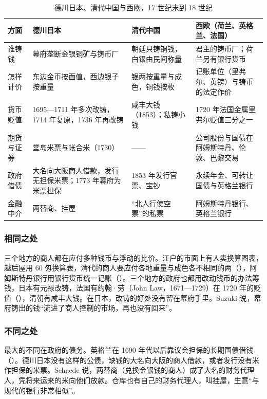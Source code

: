 \begin{table}[htbp]\centering\small
\caption{德川日本、清代中国与西欧，17 世纪末到 18 世纪}\label{tab:toku-europe}
\begin{tabularx}{\linewidth}{@{}l Y Y Y@{}}
\toprule
方面 & 德川日本 & 清代中国 & 西欧（荷兰、英格兰、法国） \\\midrule
谁铸钱 & 幕府垄断金银铜矿与铸币厂 & 朝廷只铸铜钱，白银由民间称量 & 君主的铸币厂；荷兰另有银行货币 \\
怎样计价 & 东边金币按面值，西边银子按重量 & 银两按重量与成色，铜钱按枚 & 记账单位（里弗尔、英镑）与铸币的法定作价 \\
货币贬值 & 1695—1711 年多次改铸，1714 年复原，1736 年再改铸 & 咸丰大钱（1853）；私铸小钱 & 1720 年法国金属里弗尔贬值三分之一 \\
期货与证券 & 堂岛米票与帐合米（1730） & —— & 公司股份与国债在阿姆斯特丹、伦敦、巴黎交易 \\
政府借债 & 大名向大阪商人借款，发行无担保米票；1773 年幕府为米票担保 & 1853 年发行官票、宝钞 & 永续年金、可转让国债与英格兰银行 \\
金融中介 & 两替商、挂屋 & “北人行使空票”的私票 & 阿姆斯特丹银行、英格兰银行 \\
\bottomrule
\end{tabularx}
\end{table}

\subsubsection{相同之处}
三个地方的商人都在应付多种钱币与浮动的比价。江户的市面上有人卖换算图表，越后屋用 60 匁换算表，清代的商人要应付各地重量与成色各不相同的两（），阿姆斯特丹银行用银行货币统一记账（）。三个地方的政府也都用改动钱币的办法筹钱，日本有元禄改铸，法国有约翰·劳（John Law，1671—1729）在 1720 年的贬值（），清朝有咸丰大钱。在日本，改铸的好处没有留在幕府手里。Suzuki 说，幕府铸出的钱“流进了商人控制的市场，再也没有回来”\cite{suzuki2021}。

\subsubsection{不同之处}
最大的不同在政府的债务。英格兰在 1690 年代以后靠议会担保的长期国债借钱（）。德川日本没有这样的公债，缺钱的大名向大阪的商人借款，或者发行没有米作担保的米票。Schaede 说，两替商（兑换金银钱的商人）成了大名的财务代理人，凭将来运来的米向他们放款。仓库也有自己的财务代理人，叫挂屋，生意“与现代的银行非常相似”\cite{schaede1989}。

